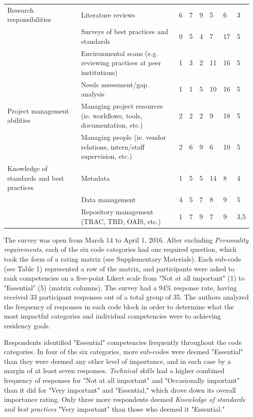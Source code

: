 \documentclass{acm_proc_article-sp}
\begin{document}
\begin{table}[t!]
{\begin{tabular}{llllllll}
Research responsibilities & Literature reviews & 6 & 7 & 9 & 5 & 6 & 3 \\
 & Surveys of best practices and standards & 0 & 5 & 4 & 7 & 17 & 5 \\
 & Environmental scans (e.g. reviewing practices at peer institutions) & 1 & 3 & 2 & 11 & 16 & 5 \\
 & Needs assessment/gap analysis & 1 & 1 & 5 & 10 & 16 & 5 \\
Project management abilities & Managing project resources (ie. workflows, tools, documentation, etc.) & 2 & 2 & 2 & 9 & 18 & 5 \\
 & Managing people (ie. vendor relations, intern/staff supervision, etc.) & 2 & 6 & 9 & 6 & 10 & 5 \\
Knowledge of standards and best practices & Metadata & 1 & 5 & 5 & 14 & 8 & 4 \\
 & Data management & 4 & 5 & 7 & 8 & 9 & 5 \\
 & Repository management (TRAC, TRD, OAIS, etc.) & 1 & 7 & 9 & 7 & 9 & 3,5
\end{tabular}%
}

\label{my-label}
\end{table}
The survey was open from March 14 to April 1, 2016. After excluding \textit{Personality requirements}, each of the six code categories had one required question, which took the form of a rating matrix (see Supplementary Materials). Each sub-code (see Table 1) represented a row of the matrix, and participants were asked to rank competencies on a five-point Likert scale from "Not at all important" (1) to "Essential" (5) (matrix columns). The survey had a 94\% response rate, having received 33 participant responses out of a total group of 35. The authors analyzed the frequency of responses in each code block in order to determine what the most impactful categories and individual competencies were to achieving residency goals.  

Respondents identified "Essential" competencies frequently throughout the code categories. In four of the six categories, more sub-codes were deemed "Essential" than they were deemed any other level of importance, and in each case by a margin of at least seven responses. \textit{Technical skills} had a higher combined frequency of responses for "Not at all important" and "Occasionally important" than it did for "Very important" and "Essential," which drove down its overall importance rating. Only three more respondents deemed \textit{Knowledge of standards and best practices} "Very important" than those who deemed it "Essential."
\end{document}
